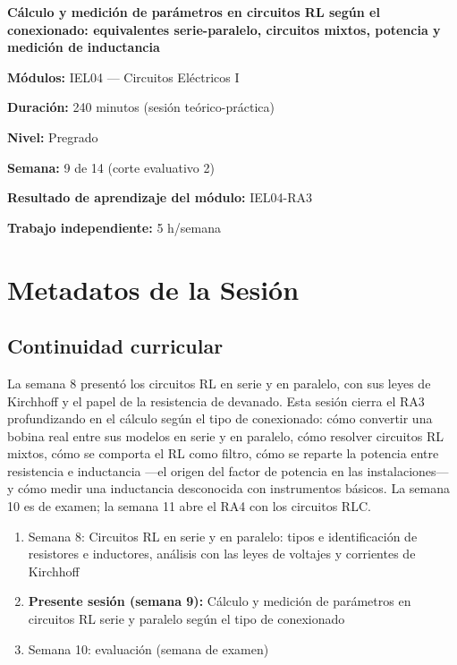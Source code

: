 \documentclass[11pt,letterpaper]{article}
\begin{document}
\begin{cabecera}
{\color{iubyellow}\Large\bfseries Cálculo y medición de parámetros en circuitos RL según el conexionado: equivalentes serie-paralelo, circuitos mixtos, potencia y medición de inductancia\par}
\vspace{0.6em}
\small
\textbf{\color{iubyellow}Módulos:} IEL04 --- Circuitos Eléctricos I\par
\textbf{\color{iubyellow}Duración:} 240 minutos (sesión teórico-práctica)\par
\textbf{\color{iubyellow}Nivel:} Pregrado\par
\textbf{\color{iubyellow}Semana:} 9 de 14 (corte evaluativo 2)\par
\textbf{\color{iubyellow}Resultado de aprendizaje del módulo:} IEL04-RA3\par
\textbf{\color{iubyellow}Trabajo independiente:} 5 h/semana\par
\end{cabecera}

\section{Metadatos de la Sesión}

\subsection{Continuidad curricular}

La semana 8 presentó los circuitos RL en serie y en paralelo, con sus leyes de Kirchhoff y el papel de la resistencia de devanado. Esta sesión cierra el RA3 profundizando en el cálculo según el tipo de conexionado: cómo convertir una bobina real entre sus modelos en serie y en paralelo, cómo resolver circuitos RL mixtos, cómo se comporta el RL como filtro, cómo se reparte la potencia entre resistencia e inductancia ---el origen del factor de potencia en las instalaciones--- y cómo medir una inductancia desconocida con instrumentos básicos. La semana 10 es de examen; la semana 11 abre el RA4 con los circuitos RLC.

\begin{enumerate}
  \item Semana 8: Circuitos RL en serie y en paralelo: tipos e identificación de resistores e inductores, análisis con las leyes de voltajes y corrientes de Kirchhoff
  \item \textbf{Presente sesión (semana 9):} Cálculo y medición de parámetros en circuitos RL serie y paralelo según el tipo de conexionado
  \item Semana 10: evaluación (semana de examen)
\end{enumerate}
\end{document}
